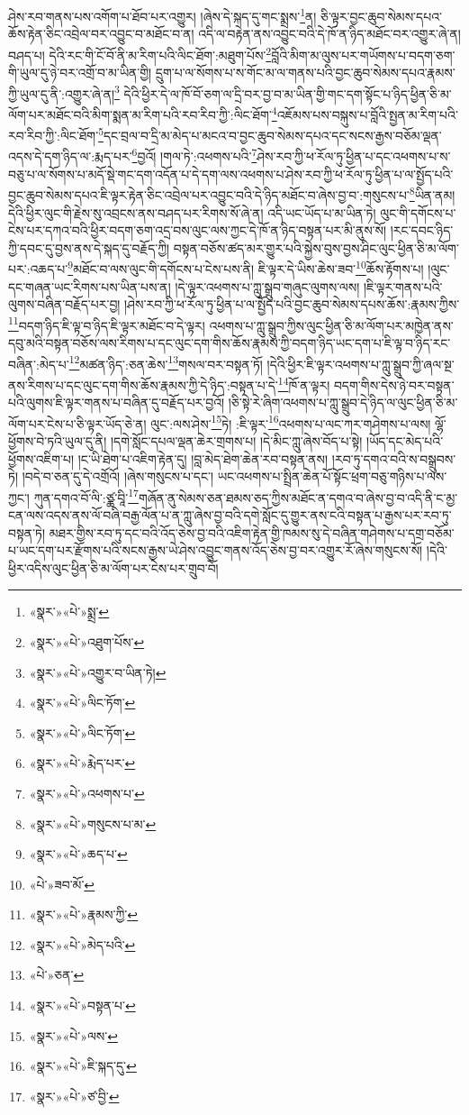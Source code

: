 ཤེས་རབ་གནས་པས་འགོག་པ་ཐོབ་པར་འགྱུར། །ཞེས་དེ་སྐད་དུ་གང་སྨྲས་\footnote{«སྣར་»«པེ་»སྨྲ་}ན། ཅི་ལྟར་བྱང་ཆུབ་སེམས་དཔའ་ཆོས་རྟེན་ཅིང་འབྲེལ་བར་འབྱུང་བ་མཐོང་བ་ན། འདི་ལ་བརྟེན་ནས་འབྱུང་བའི་དེ་ཁོ་ན་ཉིད་མཐོང་བར་འགྱུར་ཞེ་ན། བཤད་པ། དེའི་རང་གི་ངོ་བོ་ནི་མ་རིག་པའི་ལིང་ཐོག་:མཐུག་པོས་\footnote{«སྣར་»«པེ་»འཐུག་པོས་}བློའི་མིག་མ་ལུས་པར་གཡོགས་པ་བདག་ཅག་གི་ཡུལ་དུ་ཉེ་བར་འགྲོ་བ་མ་ཡིན་གྱི། དྲུག་པ་ལ་སོགས་པ་ས་གོང་མ་ལ་གནས་པའི་བྱང་ཆུབ་སེམས་དཔའ་རྣམས་ཀྱི་ཡུལ་དུ་ནི་:འགྱུར་ཞེ་ན།\footnote{«སྣར་»«པེ་»འགྱུར་བ་ཡིན་ཏེ།} དེའི་ཕྱིར་དེ་ལ་ཁོ་བོ་ཅག་ལ་དྲི་བར་བྱ་བ་མ་ཡིན་གྱི་གང་དག་སྟོང་པ་ཉིད་ཕྱིན་ཅི་མ་ལོག་པར་མཐོང་བའི་མིག་སྨན་མ་རིག་པའི་རབ་རིབ་ཀྱི་:ལིང་ཐོག་\footnote{«སྣར་»«པེ་»ལིང་ཏོག་}འཇོམས་པས་བསྐུས་པ་བློའི་སྤྱན་མ་རིག་པའི་རབ་རིབ་ཀྱི་:ལིང་ཐོག་\footnote{«སྣར་»«པེ་»ལིང་ཏོག་}དང་བྲལ་བ་དྲི་མ་མེད་པ་མངའ་བ་བྱང་ཆུབ་སེམས་དཔའ་དང་སངས་རྒྱས་བཅོམ་ལྡན་འདས་དེ་དག་ཉིད་ལ་:རྨད་པར་\footnote{«སྣར་»«པེ་»རྨེད་པར་}བྱའོ། །གལ་ཏེ་:འཕགས་པའི་\footnote{«སྣར་»«པེ་»འཕགས་པ་}ཤེས་རབ་ཀྱི་ཕ་རོལ་ཏུ་ཕྱིན་པ་དང་འཕགས་པ་ས་བཅུ་པ་ལ་སོགས་པ་མདོ་སྡེ་གང་དག་འདོན་པ་དེ་དག་ལས་འཕགས་པ་ཤེས་རབ་ཀྱི་ཕ་རོལ་ཏུ་ཕྱིན་པ་ལ་སྤྱོད་པའི་བྱང་ཆུབ་སེམས་དཔའ་ཇི་ལྟར་རྟེན་ཅིང་འབྲེལ་པར་འབྱུང་བའི་དེ་ཉིད་མཐོང་བ་ཞེས་བྱ་བ་:གསུངས་པ་\footnote{«སྣར་»«པེ་»གསུངས་པ་མ་}ཡིན་ནམ། དེའི་ཕྱིར་ལུང་གི་རྗེས་སུ་འབྲངས་ནས་བཤད་པར་རིགས་སོ་ཞེ་ན། འདི་ཡང་ཡོད་པ་མ་ཡིན་ཏེ། ལུང་གི་དགོངས་པ་ངེས་པར་དཀའ་བའི་ཕྱིར་བདག་ཅག་འདྲ་བས་ལུང་ལས་ཀྱང་དེ་ཁོ་ན་ཉིད་བསྟན་པར་མི་ནུས་སོ། །རང་དབང་ཉིད་ཀྱི་དབང་དུ་བྱས་ནས་དེ་སྐད་དུ་བརྗོད་ཀྱི། བསྟན་བཅོས་ཚད་མར་གྱུར་པའི་སྐྱེས་བུས་བྱས་ཤིང་ལུང་ཕྱིན་ཅི་མ་ལོག་པར་:འཆད་པ་\footnote{«སྣར་»«པེ་»ཆད་པ་}མཐོང་བ་ལས་ལུང་གི་དགོངས་པ་ངེས་པས་ནི། ཇི་ལྟར་དེ་ཡིས་ཆེས་ཟབ་\footnote{«པེ་»ཟབ་མོ་}ཆོས་རྟོགས་པ། །ལུང་དང་གཞན་ཡང་རིགས་པས་ཡིན་པས་ན། །དེ་ལྟར་འཕགས་པ་ཀླུ་སྒྲུབ་གཞུང་ལུགས་ལས། །ཇི་ལྟར་གནས་པའི་ལུགས་བཞིན་བརྗོད་པར་བྱ། །ཤེས་རབ་ཀྱི་ཕ་རོལ་ཏུ་ཕྱིན་པ་ལ་སྤྱོད་པའི་བྱང་ཆུབ་སེམས་དཔས་ཆོས་:རྣམས་ཀྱིས་\footnote{«སྣར་»«པེ་»རྣམས་ཀྱི་}བདག་ཉིད་ཇི་ལྟ་བ་ཉིད་ཇི་ལྟར་མཐོང་བ་དེ་ལྟར། འཕགས་པ་ཀླུ་སྒྲུབ་ཀྱིས་ལུང་ཕྱིན་ཅི་མ་ལོག་པར་མཁྱེན་ནས་དབུ་མའི་བསྟན་བཅོས་ལས་རིགས་པ་དང་ལུང་དག་གིས་ཆོས་རྣམས་ཀྱི་བདག་ཉིད་ཡང་དག་པ་ཇི་ལྟ་བ་ཉིད་རང་བཞིན་:མེད་པ་\footnote{«སྣར་»«པེ་»མེད་པའི་}མཚན་ཉིད་:ཅན་ཆེས་\footnote{«པེ་»ཅན་}གསལ་བར་བསྟན་ཏོ། །དེའི་ཕྱིར་ཇི་ལྟར་འཕགས་པ་ཀླུ་སྒྲུབ་ཀྱི་ཞལ་སྔ་ནས་རིགས་པ་དང་ལུང་དག་གིས་ཆོས་རྣམས་ཀྱི་དེ་ཉིད་:བསྟན་པ་དེ་\footnote{«སྣར་»«པེ་»བསྟན་པ་}ཁོ་ན་ལྟར། བདག་གིས་དེས་ཉེ་བར་བསྟན་པའི་ལུགས་ཇི་ལྟར་གནས་པ་བཞིན་དུ་བརྗོད་པར་བྱའོ། །ཅི་སྟེ་རེ་ཞིག་འཕགས་པ་ཀླུ་སྒྲུབ་དེ་ཉིད་ལ་ལུང་ཕྱིན་ཅི་མ་ལོག་པར་ངེས་པ་ཅི་ལྟར་ཡོད་ཅེ་ན། ལུང་:ལས་ཤེས་\footnote{«སྣར་»«པེ་»ལས་}ཏེ། :ཇི་ལྟར་\footnote{«སྣར་»«པེ་»ཇི་སྐད་དུ་}འཕགས་པ་ལང་ཀར་གཤེགས་པ་ལས། ལྷོ་ཕྱོགས་བེ་ཏའི་ཡུལ་དུ་ནི། །དགེ་སློང་དཔལ་ལྡན་ཆེར་གྲགས་པ། །དེ་མིང་ཀླུ་ཞེས་བོད་པ་སྟེ། །ཡོད་དང་མེད་པའི་ཕྱོགས་འཇིག་པ། །ང་ཡི་ཐེག་པ་འཇིག་རྟེན་དུ། །བླ་མེད་ཐེག་ཆེན་རབ་བསྟན་ནས། །རབ་ཏུ་དགའ་བའི་ས་བསྒྲུབས་ཏེ། །བདེ་བ་ཅན་དུ་དེ་འགྲོའོ། །ཞེས་གསུངས་པ་དང་། ཡང་འཕགས་པ་སྤྲིན་ཆེན་པོ་སྟོང་ཕྲག་བཅུ་གཉིས་པ་ལས་ཀྱང་། ཀུན་དགའ་བོ་ལི་:ཙྪ་བཱི་\footnote{«སྣར་»«པེ་»ཙ་བྱི་}གཞོན་ནུ་སེམས་ཅན་ཐམས་ཅད་ཀྱིས་མཐོང་ན་དགའ་བ་ཞེས་བྱ་བ་འདི་ནི་ང་མྱ་ངན་ལས་འདས་ནས་ལོ་བཞི་བརྒྱ་ལོན་པ་ན་ཀླུ་ཞེས་བྱ་བའི་དགེ་སློང་དུ་གྱུར་ནས་ངའི་བསྟན་པ་རྒྱས་པར་རབ་ཏུ་བསྟན་ཏེ། མཐར་གྱིས་རབ་ཏུ་དང་བའི་འོད་ཅེས་བྱ་བའི་འཇིག་རྟེན་གྱི་ཁམས་སུ་དེ་བཞིན་གཤེགས་པ་དགྲ་བཅོམ་པ་ཡང་དག་པར་རྫོགས་པའི་སངས་རྒྱས་ཡེ་ཤེས་འབྱུང་གནས་འོད་ཅེས་བྱ་བར་འགྱུར་རོ་ཞེས་གསུངས་སོ། །དེའི་ཕྱིར་འདིས་ལུང་ཕྱིན་ཅི་མ་ལོག་པར་ངེས་པར་གྲུབ་བོ། 